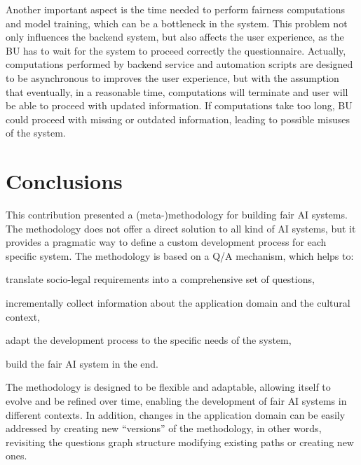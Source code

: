 \documentclass[12pt,a4paper,openright,twoside]{book}
\begin{document}
Another important aspect is the time needed to perform fairness computations and model training, which can be a bottleneck in the system.
%
This problem not only influences the backend system, but also affects the user experience, as the \ac{BU} has to wait for the system to proceed correctly the questionnaire.
%
Actually, computations performed by backend service and automation scripts are designed to be asynchronous to improves the user experience, but with the assumption that eventually, in a reasonable time, computations will terminate and user will be able to proceed with updated information.
%
If computations take too long, \ac{BU} could proceed with missing or outdated information, leading to possible misuses of the system.



\chapter{Conclusions}%
\label{chap:conclusions}

This contribution presented a (meta-)methodology for building fair \ac{AI} systems.
%
The methodology does not offer a direct solution to all kind of \ac{AI} systems, but it provides a pragmatic way to define a custom development process for each specific system.
%
The methodology is based on a \ac{Q/A} mechanism, which helps to:
\begin{enumerate*}[label=(\roman*)]
    \item translate socio-legal requirements into a comprehensive set of questions,
    \item incrementally collect information about the application domain and the cultural context,
    \item adapt the development process to the specific needs of the system,
    \item build the fair \ac{AI} system in the end.
\end{enumerate*}
%
The methodology is designed to be flexible and adaptable, allowing itself to evolve and be refined over time, enabling the development of fair \ac{AI} systems in different contexts.
%
In addition, changes in the application domain can be easily addressed by creating new ``versions'' of the methodology, in other words, revisiting the questions graph structure modifying existing paths or creating new ones.
\end{document}
